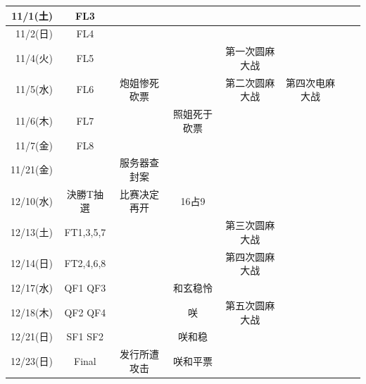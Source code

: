 {\begin{longtable}{rccccccc}
	11/1(土) & FL3 &  &  &  &  &\\ \hline
	11/2(日) & FL4 &  &  &  &  &\\ \hline
	11/4(火) & FL5 &  &  & 第一次圆麻大战 &  &\\ \hline
	11/5(水) & FL6 & 炮姐惨死砍票 &  & 第二次圆麻大战 & 第四次电麻大战 &\\ \hline
	11/6(木) & FL7 &  & 照姐死于砍票 &  &  &\\ \hline
	11/7(金) & FL8 &  &  &  &  &\\ \hline
	11/21(金) &  & 服务器查封案 &  &  &  &\\ \hline
	12/10(水) & 決勝T抽選 & 比赛决定再开 & 16占9 &  &  &\\ \hline
	12/13(土) & FT1,3,5,7 &  &  & 第三次圆麻大战 &  &\\ \hline
	12/14(日) & FT2,4,6,8 &  &  & 第四次圆麻大战 &  &\\ \hline
	12/17(水) & QF1 QF3 &  & 和玄稳怜 &  &  &\\ \hline
	12/18(木) & QF2 QF4 &  & 咲 & 第五次圆麻大战 &  &\\ \hline
	12/21(日) & SF1 SF2 &  & 咲和稳 &  &  &\\ \hline
	12/23(日) & Final & 发行所遭攻击 & 咲和平票 &  &  &  \\ \hline
\end{longtable}
}
